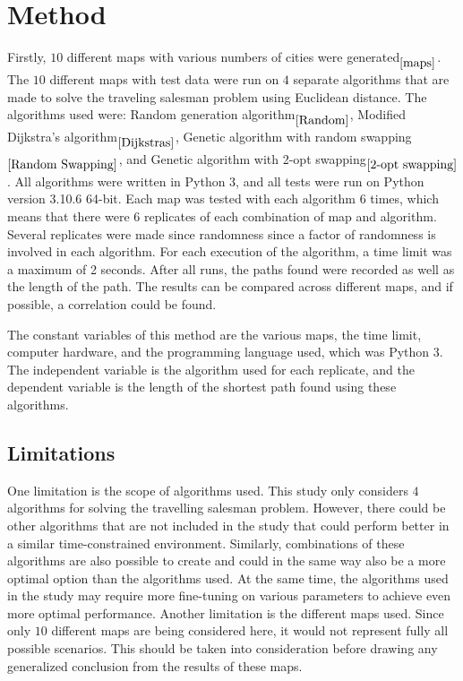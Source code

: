 \documentclass{article}
\begin{document}
\section{Method}\label{Method}
Firstly, $10$ different maps with various numbers of cities were generated$_{\ref{maps}}$. The $10$ different maps with test data were run on $4$ separate algorithms that are made to solve the traveling salesman problem using Euclidean distance. The algorithms used were: Random generation algorithm$_{\ref{Random}}$, Modified Dijkstra's algorithm$_{\ref{Dijkstras}}$, Genetic algorithm with random swapping$_{\ref{Random Swapping}}$, and Genetic algorithm with 2-opt swapping$_{\ref{2-opt swapping}}$. All algorithms were written in Python 3, and all tests were run on Python version 3.10.6 64-bit. Each map was tested with each algorithm $6$ times, which means that there were $6$ replicates of each combination of map and algorithm. Several replicates were made since randomness since a factor of randomness is involved in each algorithm. For each execution of the algorithm, a time limit was a maximum of 2 seconds. After all runs, the paths found were recorded as well as the length of the path. The results can be compared across different maps, and if possible, a correlation could be found. 

\noindent
The constant variables of this method are the various maps, the time limit, computer hardware, and the programming language used, which was Python 3. The independent variable is the algorithm used for each replicate, and the dependent variable is the length of the shortest path found using these algorithms.


\subsection{Limitations}\label{Limitations}
One limitation is the scope of algorithms used. This study only considers $4$ algorithms for solving the travelling salesman problem. However, there could be other algorithms that are not included in the study that could perform better in a similar time-constrained environment. Similarly, combinations of these algorithms are also possible to create and could in the same way also be a more optimal option than the algorithms used. 
\noindent
At the same time, the algorithms used in the study may require more fine-tuning on various parameters to achieve even more optimal performance. 
\noindent
Another limitation is the different maps used. Since only $10$ different maps are being considered here, it would not represent fully all possible scenarios. This should be taken into consideration before drawing any generalized conclusion from the results of these maps.
\end{document}
